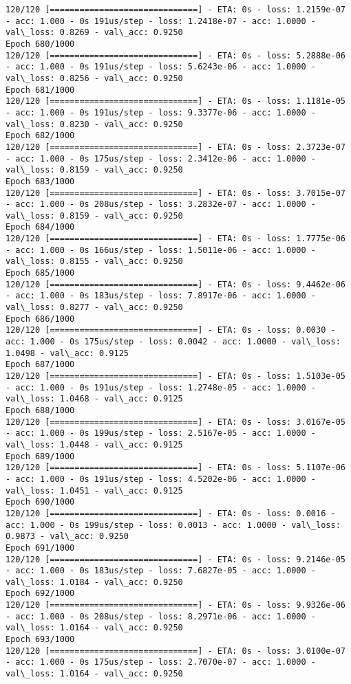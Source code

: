 \documentclass[11pt]{article}
\begin{document}
\begin{Verbatim}[commandchars=\\\{\}]
120/120 [==============================] - ETA: 0s - loss: 1.2159e-07 - acc: 1.000 - 0s 191us/step - loss: 1.2418e-07 - acc: 1.0000 - val\_loss: 0.8269 - val\_acc: 0.9250
Epoch 680/1000
120/120 [==============================] - ETA: 0s - loss: 5.2888e-06 - acc: 1.000 - 0s 191us/step - loss: 5.6243e-06 - acc: 1.0000 - val\_loss: 0.8256 - val\_acc: 0.9250
Epoch 681/1000
120/120 [==============================] - ETA: 0s - loss: 1.1181e-05 - acc: 1.000 - 0s 191us/step - loss: 9.3377e-06 - acc: 1.0000 - val\_loss: 0.8230 - val\_acc: 0.9250
Epoch 682/1000
120/120 [==============================] - ETA: 0s - loss: 2.3723e-07 - acc: 1.000 - 0s 175us/step - loss: 2.3412e-06 - acc: 1.0000 - val\_loss: 0.8159 - val\_acc: 0.9250
Epoch 683/1000
120/120 [==============================] - ETA: 0s - loss: 3.7015e-07 - acc: 1.000 - 0s 208us/step - loss: 3.2832e-07 - acc: 1.0000 - val\_loss: 0.8159 - val\_acc: 0.9250
Epoch 684/1000
120/120 [==============================] - ETA: 0s - loss: 1.7775e-06 - acc: 1.000 - 0s 166us/step - loss: 1.5011e-06 - acc: 1.0000 - val\_loss: 0.8155 - val\_acc: 0.9250
Epoch 685/1000
120/120 [==============================] - ETA: 0s - loss: 9.4462e-06 - acc: 1.000 - 0s 183us/step - loss: 7.8917e-06 - acc: 1.0000 - val\_loss: 0.8277 - val\_acc: 0.9250
Epoch 686/1000
120/120 [==============================] - ETA: 0s - loss: 0.0030 - acc: 1.000 - 0s 175us/step - loss: 0.0042 - acc: 1.0000 - val\_loss: 1.0498 - val\_acc: 0.9125
Epoch 687/1000
120/120 [==============================] - ETA: 0s - loss: 1.5103e-05 - acc: 1.000 - 0s 191us/step - loss: 1.2748e-05 - acc: 1.0000 - val\_loss: 1.0468 - val\_acc: 0.9125
Epoch 688/1000
120/120 [==============================] - ETA: 0s - loss: 3.0167e-05 - acc: 1.000 - 0s 199us/step - loss: 2.5167e-05 - acc: 1.0000 - val\_loss: 1.0448 - val\_acc: 0.9125
Epoch 689/1000
120/120 [==============================] - ETA: 0s - loss: 5.1107e-06 - acc: 1.000 - 0s 191us/step - loss: 4.5202e-06 - acc: 1.0000 - val\_loss: 1.0451 - val\_acc: 0.9125
Epoch 690/1000
120/120 [==============================] - ETA: 0s - loss: 0.0016 - acc: 1.000 - 0s 199us/step - loss: 0.0013 - acc: 1.0000 - val\_loss: 0.9873 - val\_acc: 0.9250
Epoch 691/1000
120/120 [==============================] - ETA: 0s - loss: 9.2146e-05 - acc: 1.000 - 0s 183us/step - loss: 7.6827e-05 - acc: 1.0000 - val\_loss: 1.0184 - val\_acc: 0.9250
Epoch 692/1000
120/120 [==============================] - ETA: 0s - loss: 9.9326e-06 - acc: 1.000 - 0s 208us/step - loss: 8.2971e-06 - acc: 1.0000 - val\_loss: 1.0164 - val\_acc: 0.9250
Epoch 693/1000
120/120 [==============================] - ETA: 0s - loss: 3.0100e-07 - acc: 1.000 - 0s 175us/step - loss: 2.7070e-07 - acc: 1.0000 - val\_loss: 1.0164 - val\_acc: 0.9250

\end{Verbatim}
\end{document}
